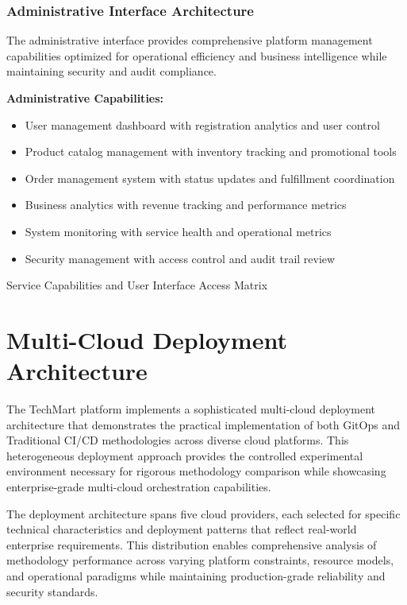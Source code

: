 \subsubsection{Administrative Interface Architecture}

The administrative interface provides comprehensive platform management capabilities optimized for operational efficiency and business intelligence while maintaining security and audit compliance.

\textbf{Administrative Capabilities:}
\begin{itemize}
\item User management dashboard with registration analytics and user control
\item Product catalog management with inventory tracking and promotional tools
\item Order management system with status updates and fulfillment coordination
\item Business analytics with revenue tracking and performance metrics
\item System monitoring with service health and operational metrics
\item Security management with access control and audit trail review
\end{itemize}

\begin{table}[H]
\centering
\caption{Service Capabilities and User Interface Access Matrix}
\label{tab:service-capabilities-matrix}
\end{table}


\section{Multi-Cloud Deployment Architecture}

The TechMart platform implements a sophisticated multi-cloud deployment architecture that demonstrates the practical implementation of both GitOps and Traditional CI/CD methodologies across diverse cloud platforms. This heterogeneous deployment approach provides the controlled experimental environment necessary for rigorous methodology comparison while showcasing enterprise-grade multi-cloud orchestration capabilities.

The deployment architecture spans five cloud providers, each selected for specific technical characteristics and deployment patterns that reflect real-world enterprise requirements. This distribution enables comprehensive analysis of methodology performance across varying platform constraints, resource models, and operational paradigms while maintaining production-grade reliability and security standards.

